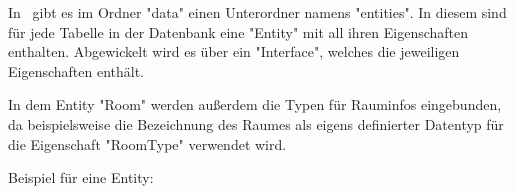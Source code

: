 
In \ZELIA\ gibt es im Ordner "data" einen Unterordner namens "entities". In diesem sind für jede Tabelle in der Datenbank eine "Entity" mit all ihren Eigenschaften enthalten. Abgewickelt wird es über ein "Interface", welches die jeweiligen Eigenschaften enthält.

In dem Entity "Room" werden außerdem die Typen für Rauminfos eingebunden, da beispielsweise die Bezeichnung des Raumes als eigens definierter Datentyp für die Eigenschaft "RoomType" verwendet wird.

Beispiel für eine Entity:

